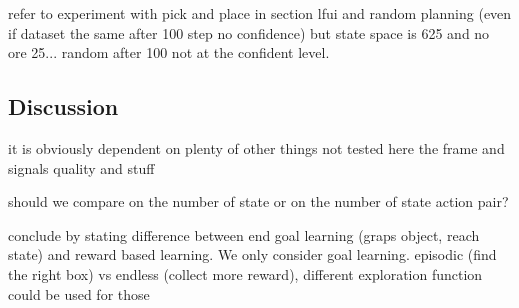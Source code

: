 refer to experiment with pick and place in section lfui and random planning (even if dataset the same after 100 step no confidence) but state space is 625 and no ore 25...
random after 100 not at the confident level.


\subsection{Discussion}

it is obviously dependent on plenty of other things not tested here the frame and signals quality and stuff

should we compare on the number of state or on the number of state action pair?

conclude by stating difference between end goal learning (graps object, reach state) and reward based learning. We only consider goal learning. episodic (find the right box) vs endless (collect more reward), different exploration function could be used for those


